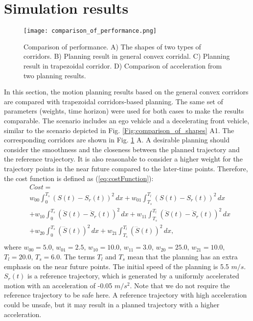 \section{Simulation results} \label{Simulation}

\begin{figure}[tbp]
\begin{center}
\texttt{[image: comparison\_of\_performance.png]}
\end{center}
\vspace{-0.2 in}
\caption{Comparison of performance. A) The shapes of two types of corridors. B) Planning result in general convex corridal. C) Planning result in trapezoidal corridor. D) Comparison of acceleration from two planning results.}
\label{Fig:comparisonOfPerformance}
\vspace{-0.2 in}
\end{figure}

In this section, the motion planning results based on the general convex corridors are compared with trapezoidal corridors-based planning. The same set of parameters (weights, time horizon) were used for both cases to make the results comparable. The scenario includes an ego vehicle and a decelerating front vehicle, similar to the scenario depicted in Fig. \ref{Fig:comparison_of_shapes} A1. The corresponding corridors are shown in Fig. \ref{Fig:comparisonOfPerformance} A. A desirable planning should consider the smoothness and the closeness between the planned trajectory and the reference trajectory. It is also reasonable to consider a higher weight for the trajectory points in the near future compared to the later-time points. Therefore, the cost function is defined as (\ref{eq:costFunction}):
{
\setlength\abovedisplayskip{1pt}
\setlength\belowdisplayskip{1pt}
\begin{equation}\begin{split}
&Cost=\\
&w_{00} \int_{0}^{T_{s}} (S(t)-S_{r}(t))^2 \,dx+w_{01} \int_{T_{s}}^{T_{l}} (S(t)-S_{r}(t))^2 \,dx \\
&+w_{10} \int_{0}^{T_{s}} (\ddot S(t)- \ddot S_{r}(t))^2 \,dx+w_{11} \int_{T_{s}}^{T_{l}} (\ddot S(t)- \ddot S_{r}(t))^2 \,dx \\ 
&+w_{20} \int_{0}^{T_{s}} (\dddot S(t))^2 \,dx+w_{21} \int_{T_{s}}^{T_{l}} (\dddot S(t))^2 \,dx, \\
\label{eq:costFunction}
\end{split}\end{equation}
}
where $w_{00}=5.0$, $w_{01}=2.5$, $w_{10}=10.0$, $w_{11}=3.0$, $w_{20}=25.0$, $w_{21}=10.0$, $T_{l}=20.0$, $T_{s}=6.0$. The terms $T_{l}$ and $T_{s}$ mean that the planning has an extra emphasis on the near future points. The initial speed of the planning is 5.5 $m/s$. $S_{r}(t)$ is a reference trajectory, which is generated by a uniformly accelerated motion with an acceleration of -0.05 $m/s^{2}$. Note that we do not require the reference trajectory to be safe here. A reference trajectory with high acceleration could be unsafe, but it may result in a planned trajectory with a higher acceleration. 

